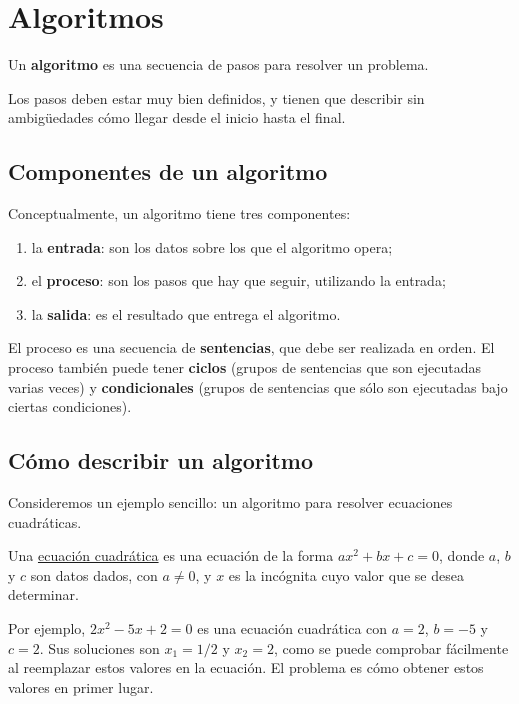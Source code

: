 \chapter{Algoritmos}

Un \textbf{algoritmo} es una secuencia de pasos para resolver un
problema.

Los pasos deben estar muy bien definidos, y tienen que describir sin
ambigüedades cómo llegar desde el inicio hasta el final.

\section{Componentes de un algoritmo}

Conceptualmente, un algoritmo tiene tres componentes:

\begin{enumerate}
\item
  la \textbf{entrada}: son los datos sobre los que el algoritmo opera;
\item
  el \textbf{proceso}: son los pasos que hay que seguir, utilizando la
  entrada;
\item
  la \textbf{salida}: es el resultado que entrega el algoritmo.
\end{enumerate}

El proceso es una secuencia de \textbf{sentencias}, que debe ser
realizada en orden. El proceso también puede tener \textbf{ciclos}
(grupos de sentencias que son ejecutadas varias veces) y
\textbf{condicionales} (grupos de sentencias que sólo son ejecutadas
bajo ciertas condiciones).

\section{Cómo describir un algoritmo}

Consideremos un ejemplo sencillo: un algoritmo para resolver ecuaciones
cuadráticas.

Una
\href{http://es.wikipedia.org/wiki/Ecuaci\%C3\%B3n\_de\_segundo\_grado}{ecuación
cuadrática} es una ecuación de la forma \(ax^2 + bx + c = 0\), donde
\(a\), \(b\) y \(c\) son datos dados, con \(a\ne 0\), y \(x\) es la incógnita cuyo
valor que se desea determinar.

Por ejemplo, \(2x^2 - 5x + 2 = 0\) es una ecuación cuadrática con \(a =
2\), \(b = -5\) y \(c = 2\). Sus soluciones son \(x_1 = 1/2\) y \(x_2 = 2\),
como se puede comprobar fácilmente al reemplazar estos valores en la
ecuación. El problema es cómo obtener estos valores en primer lugar.

